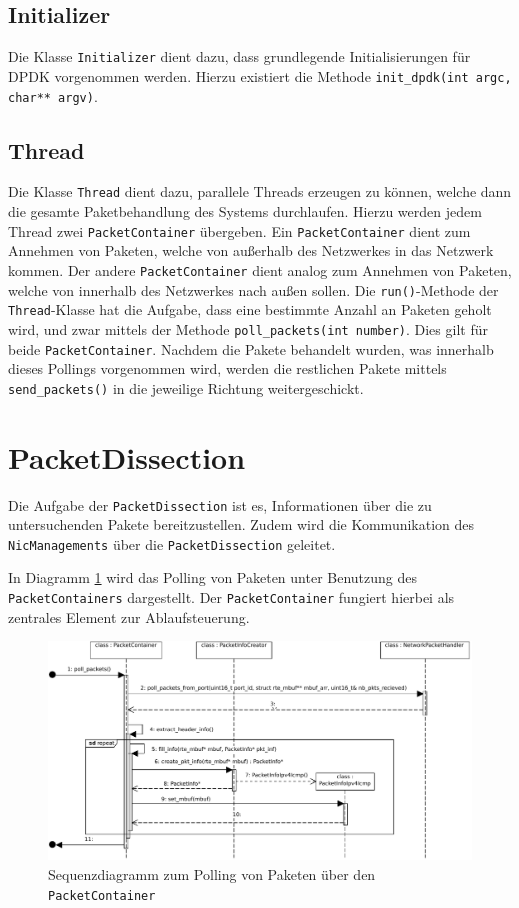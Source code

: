 \documentclass[../review_3.tex]{subfiles}
\begin{document}
\subsection{Initializer}
Die Klasse \texttt{Initializer} dient dazu, dass grundlegende Initialisierungen für DPDK vorgenommen werden. Hierzu existiert die Methode \texttt{init\_dpdk(int argc, char** argv)}.

\subsection{Thread}
Die Klasse \texttt{Thread} dient dazu, parallele Threads erzeugen zu können, welche dann die gesamte Paketbehandlung des Systems durchlaufen. Hierzu werden jedem Thread zwei \texttt{PacketContainer} übergeben. Ein \texttt{PacketContainer} dient zum Annehmen von Paketen, welche von außerhalb des Netzwerkes in das Netzwerk kommen. Der andere \texttt{PacketContainer} dient analog zum Annehmen von Paketen, welche von innerhalb des Netzwerkes nach außen sollen. Die \texttt{run()}-Methode der \texttt{Thread}-Klasse hat die Aufgabe, dass eine bestimmte Anzahl an Paketen geholt wird, und zwar mittels der Methode \texttt{poll\_packets(int number)}. Dies gilt für beide \texttt{PacketContainer}. Nachdem die Pakete behandelt wurden, was innerhalb dieses Pollings vorgenommen wird, werden die restlichen Pakete mittels \texttt{send\_packets()} in die jeweilige Richtung weitergeschickt.

\section{PacketDissection}
Die Aufgabe der \texttt{PacketDissection} ist es, Informationen über die zu untersuchenden Pakete bereitzustellen. Zudem wird die Kommunikation des \texttt{NicManagements} über die \texttt{PacketDissection} geleitet.

In Diagramm \ref{Sequenzdiagramm_PacketDissection} wird das Polling von Paketen unter Benutzung des \texttt{PacketContainers} dargestellt. Der \texttt{PacketContainer} fungiert hierbei als zentrales Element zur Ablaufsteuerung.

\begin{figure}
    \centering
    \includegraphics[width=\linewidth]{img/SequenceDiagramPacketDissection2.pdf}
    \caption{Sequenzdiagramm zum Polling von Paketen über den \texttt{PacketContainer}}
    \label{Sequenzdiagramm_PacketDissection}
\end{figure}
\end{document}
